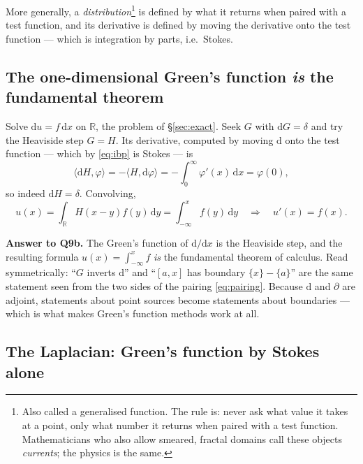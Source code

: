 \documentclass[10pt,a4paper]{article}
\newcommand{\dd}{\mathrm{d}}
\newcommand{\R}{\mathbb{R}}
\newcommand{\pair}[2]{\langle #1 , #2 \rangle}
\theoremstyle{plain}
\theoremstyle{definition}
\numberwithin{equation}{section}
\begin{document}
\noindent More generally, a \emph{distribution}\footnote{Also called a generalised function.
The rule is: never ask what value it takes at a point, only what number it returns when paired
with a test function. Mathematicians who also allow smeared, fractal domains call these objects
\emph{currents}; the physics is the same.} is defined by what it returns when paired with a
test function, and its derivative is defined by moving the derivative onto the test function ---
which is integration by parts, i.e.\ Stokes.

\subsection{The one-dimensional Green's function \emph{is} the fundamental theorem}
\label{sec:1dgreen}

Solve $\dd u=f\,\dd x$ on $\R$, the problem of \S\ref{sec:exact}. Seek $G$ with $\dd G=\delta$
and try the Heaviside step $G=H$. Its derivative, computed by moving $\dd$ onto the test
function --- which by \eqref{eq:ibp} is Stokes --- is
\begin{equation}
\pair{\dd H}{\varphi}=-\pair{H}{\dd\varphi}=-\int_0^\infty\varphi'(x)\,\dd x=\varphi(0),
\end{equation}
so indeed $\dd H=\delta$. Convolving,
\begin{equation}
u(x)=\int_\R H(x-y)f(y)\,\dd y=\int_{-\infty}^xf(y)\,\dd y
\quad\Longrightarrow\quad u'(x)=f(x).
\end{equation}

\begin{keybox}
\textbf{Answer to Q9b.} The Green's function of $\dd/\dd x$ is the Heaviside step, and the
resulting formula $u(x)=\int_{-\infty}^xf$ \emph{is} the fundamental theorem of calculus. Read
symmetrically: ``$G$ inverts $\dd$'' and ``$[a,x]$ has boundary $\{x\}-\{a\}$'' are the same
statement seen from the two sides of the pairing \eqref{eq:pairing}. Because $\dd$ and $\partial$
are adjoint, statements about point sources become statements about boundaries --- which is what
makes Green's function methods work at all.
\end{keybox}

\subsection{The Laplacian: Green's function by Stokes alone}
\label{sec:laplacegreen}
\end{document}
